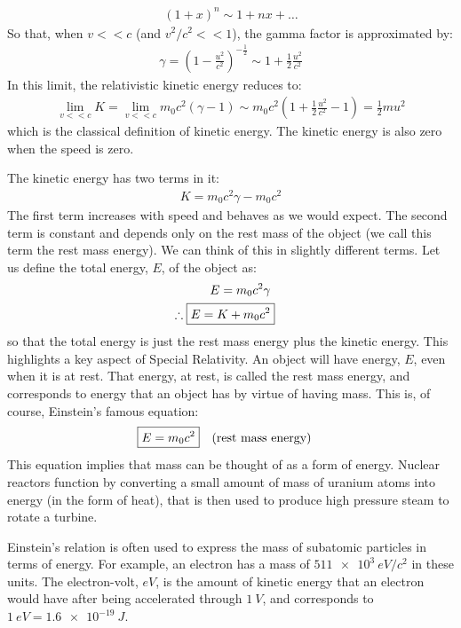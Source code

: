 \begin{align*}
(1+x)^n\sim 1 + nx +\dots 
\end{align*}
So that, when $v<<c$ (and $v^2/c^2<<1$), the gamma factor is approximated by:
\begin{align*}
\gamma=\left(1-\frac{u^2}{c^2}\right)^{-\frac{1}{2}}\sim 1+\frac{1}{2}\frac{u^2}{c^2}
\end{align*}
In this limit, the relativistic kinetic energy reduces to:
\begin{align*}
\lim_{v<<c}K=\lim_{v<<c}m_0c^2(\gamma -1)\sim m_0c^2\left(1+\frac{1}{2}\frac{u^2}{c^2} - 1  \right)=\frac{1}{2}mu^2
\end{align*}
which is the classical definition of kinetic energy. The kinetic energy is also zero when the speed is zero.

The kinetic energy has two terms in it:
\begin{align*}
K=m_0c^2\gamma -m_0c^2
\end{align*}
The first term increases with speed and behaves as we would expect. The second term is constant and depends only on the rest mass of the object (we call this term the rest mass energy). We can think of this in slightly different terms. Let us define the total energy, $E$, of the object as:
\begin{align*}
E=m_0c^2\gamma\\
\therefore \;\Aboxed{E = K+m_0c^2}
\end{align*}
so that the total energy is just the rest mass energy plus the kinetic energy. This highlights a key aspect of Special Relativity. An object will have energy, $E$, even when it is at rest. That energy, at rest, is called the rest mass energy, and corresponds to energy that an object has by virtue of having mass. This is, of course, Einstein's famous equation:
\begin{align*}
\Aboxed{E=m_0c^2}\quad \text{(rest mass energy)}
\end{align*}
This equation implies that mass can be thought of as a form of energy. Nuclear reactors function by converting a small amount of mass of uranium atoms into energy (in the form of heat), that is then used to produce high pressure steam to rotate a turbine.

Einstein's relation is often used to express the mass of subatomic particles in terms of energy. For example, an electron has a mass of $\SI{511e3}{eV/c^2}$ in these units. The electron-volt, $eV$, is the amount of kinetic energy that an electron would have after being accelerated through $\SI{1}{V}$, and corresponds to $\SI{1}{eV}=\SI{1.6e-19}{J}$.

